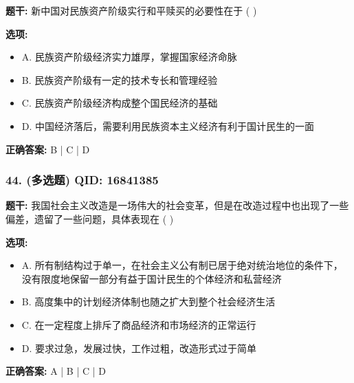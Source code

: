 \documentclass[12pt,UTF8]{ctexart}
\begin{document}
\textbf{题干:}
新中国对民族资产阶级实行和平赎买的必要性在于 ( )

\textbf{选项:}
\begin{itemize}[leftmargin=*]

  \item A. 民族资产阶级经济实力雄厚，掌握国家经济命脉

  \item B. 民族资产阶级有一定的技术专长和管理经验

  \item C. 民族资产阶级经济构成整个国民经济的基础

  \item D. 中国经济落后，需要利用民族资本主义经济有利于国计民生的一面

\end{itemize}

\textbf{正确答案:}
B | C | D

\vspace{0.3em}\hrulefill\vspace{0.7em}

\subsubsection*{44. (多选题) \small QID: 16841385}

\textbf{题干:}
我国社会主义改造是一场伟大的社会变革，但是在改造过程中也出现了一些偏差，遗留了一些问题，具体表现在 ( )

\textbf{选项:}
\begin{itemize}[leftmargin=*]

  \item A. 所有制结构过于单一，在社会主义公有制已居于绝对统治地位的条件下，没有限度地保留一部分有益于国计民生的个体经济和私营经济

  \item B. 高度集中的计划经济体制也随之扩大到整个社会经济生活

  \item C. 在一定程度上排斥了商品经济和市场经济的正常运行

  \item D. 要求过急，发展过快，工作过粗，改造形式过于简单

\end{itemize}

\textbf{正确答案:}
A | B | C | D

\vspace{0.3em}\hrulefill\vspace{0.7em}
\end{document}
